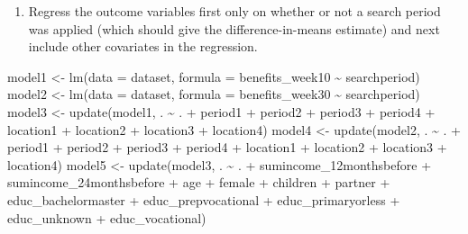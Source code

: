 \documentclass[
]{article}
\newenvironment{Shaded}{\begin{snugshade}}{\end{snugshade}}
\newcommand{\AttributeTok}[1]{\textcolor[rgb]{0.77,0.63,0.00}{#1}}
\newcommand{\FunctionTok}[1]{\textcolor[rgb]{0.00,0.00,0.00}{#1}}
\newcommand{\NormalTok}[1]{#1}
\newcommand{\OtherTok}[1]{\textcolor[rgb]{0.56,0.35,0.01}{#1}}
\newcommand{\SpecialCharTok}[1]{\textcolor[rgb]{0.00,0.00,0.00}{#1}}
\providecommand{\tightlist}{%
  \setlength{\itemsep}{0pt}\setlength{\parskip}{0pt}}
\let\oldShaded\Shaded
\let\endoldShaded\endShaded
\renewenvironment{Shaded}{\footnotesize\oldShaded}{\endoldShaded}
\begin{document}
\begin{enumerate}
\def\labelenumi{\arabic{enumi}.}
\setcounter{enumi}{2}
\tightlist
\item
  Regress the outcome variables first only on whether or not a search
  period was applied (which should give the difference-in-means
  estimate) and next include other covariates in the regression.
\end{enumerate}

\begin{Shaded}
\begin{Highlighting}[]
\NormalTok{model1 }\OtherTok{\textless{}{-}} \FunctionTok{lm}\NormalTok{(}\AttributeTok{data =}\NormalTok{ dataset, }\AttributeTok{formula =}\NormalTok{ benefits\_week10 }\SpecialCharTok{\textasciitilde{}}\NormalTok{ searchperiod)}
\NormalTok{model2 }\OtherTok{\textless{}{-}} \FunctionTok{lm}\NormalTok{(}\AttributeTok{data =}\NormalTok{ dataset, }\AttributeTok{formula =}\NormalTok{ benefits\_week30 }\SpecialCharTok{\textasciitilde{}}\NormalTok{ searchperiod)}
\NormalTok{model3 }\OtherTok{\textless{}{-}} \FunctionTok{update}\NormalTok{(model1, . }\SpecialCharTok{\textasciitilde{}}\NormalTok{ . }\SpecialCharTok{+}\NormalTok{ period1 }\SpecialCharTok{+}\NormalTok{ period2 }\SpecialCharTok{+}\NormalTok{ period3 }\SpecialCharTok{+}\NormalTok{ period4 }\SpecialCharTok{+} 
\NormalTok{                     location1 }\SpecialCharTok{+}\NormalTok{ location2 }\SpecialCharTok{+}\NormalTok{ location3 }\SpecialCharTok{+}\NormalTok{ location4)}
\NormalTok{model4 }\OtherTok{\textless{}{-}} \FunctionTok{update}\NormalTok{(model2, . }\SpecialCharTok{\textasciitilde{}}\NormalTok{ . }\SpecialCharTok{+}\NormalTok{ period1 }\SpecialCharTok{+}\NormalTok{ period2 }\SpecialCharTok{+}\NormalTok{ period3 }\SpecialCharTok{+}\NormalTok{ period4 }\SpecialCharTok{+} 
\NormalTok{                     location1 }\SpecialCharTok{+}\NormalTok{ location2 }\SpecialCharTok{+}\NormalTok{ location3 }\SpecialCharTok{+}\NormalTok{ location4)}
\NormalTok{model5 }\OtherTok{\textless{}{-}} \FunctionTok{update}\NormalTok{(model3, . }\SpecialCharTok{\textasciitilde{}}\NormalTok{ . }\SpecialCharTok{+}\NormalTok{ sumincome\_12monthsbefore }\SpecialCharTok{+} 
\NormalTok{                     sumincome\_24monthsbefore }\SpecialCharTok{+}\NormalTok{ age }\SpecialCharTok{+}\NormalTok{ female }\SpecialCharTok{+}\NormalTok{ children }\SpecialCharTok{+} 
\NormalTok{                     partner }\SpecialCharTok{+}\NormalTok{ educ\_bachelormaster }\SpecialCharTok{+}\NormalTok{ educ\_prepvocational }\SpecialCharTok{+} 
\NormalTok{                     educ\_primaryorless }\SpecialCharTok{+}\NormalTok{ educ\_unknown }\SpecialCharTok{+}\NormalTok{ educ\_vocational)}

\end{Highlighting}
\end{Shaded}
\end{document}
